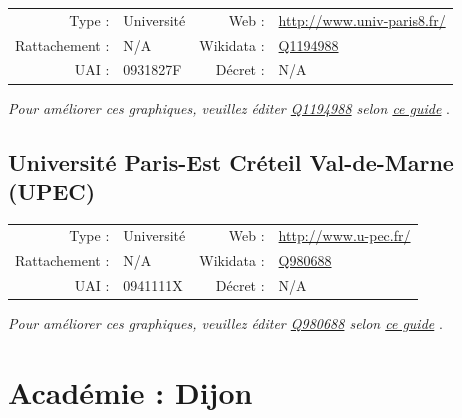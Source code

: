 \documentclass[12pt,french,landscape]{article}
\begin{document}
\begin{tabular*}{0.45\textwidth}{rp{2cm}rl}  
\hline  
Type : & Université & Web : &\href{http://www.univ-paris8.fr/}{http://www.univ-paris8.fr/} \\  
Rattachement : & N/A & Wikidata : & \href{https://www.wikidata.org/entity/Q1194988}{Q1194988} \\  
UAI : & 0931827F & Décret : & N/A \\  
\hline  
\end{tabular*}

\textit{\scriptsize Pour améliorer ces graphiques, veuillez éditer \href{https://www.wikidata.org/entity/Q1194988}{Q1194988}  selon \href{https://github.com/cpesr/wikidataESR/blob/master/Rmd/wikidataESR.md}{ce guide}}
.


\newpage

\hypertarget{universituxe9-paris-est-cruxe9teil-val-de-marne-upec}{%
\subsection{Université Paris-Est Créteil Val-de-Marne
(UPEC)}\label{universituxe9-paris-est-cruxe9teil-val-de-marne-upec}}

\begin{tabular*}{0.45\textwidth}{rp{2cm}rl}  
\hline  
Type : & Université & Web : &\href{http://www.u-pec.fr/}{http://www.u-pec.fr/} \\  
Rattachement : & N/A & Wikidata : & \href{https://www.wikidata.org/entity/Q980688}{Q980688} \\  
UAI : & 0941111X & Décret : & N/A \\  
\hline  
\end{tabular*}

\textit{\scriptsize Pour améliorer ces graphiques, veuillez éditer \href{https://www.wikidata.org/entity/Q980688}{Q980688}  selon \href{https://github.com/cpesr/wikidataESR/blob/master/Rmd/wikidataESR.md}{ce guide}}
.


\newpage

\hypertarget{acaduxe9mie-dijon}{%
\section{Académie : Dijon}\label{acaduxe9mie-dijon}}
\end{document}
